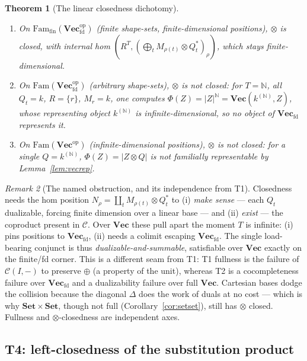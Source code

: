 \documentclass[11pt]{amsart}
\theoremstyle{plain}
\newtheorem{theorem}{Theorem}[section]
\theoremstyle{definition}
\theoremstyle{remark}
\newtheorem{remark}[theorem]{Remark}
\newcommand{\C}{\mathcal{C}}
\newcommand{\Set}{\mathbf{Set}}
\newcommand{\Vect}{\mathbf{Vec}}
\newcommand{\Vecfd}{\mathbf{Vec}_{\mathrm{fd}}}
\newcommand{\Fam}{\mathrm{Fam}}
\newcommand{\op}{\mathrm{op}}
\newcommand{\coprodd}{\textstyle\coprod}
\begin{document}
\begin{theorem}[The linear closedness dichotomy]\label{thm:vecdicho}
\begin{enumerate}
\item On $\Fam_{\mathrm{fin}}(\Vecfd^\op)$ (finite shape-sets, finite-dimensional positions),
$\otimes$ is closed, with internal hom $(R^T,(\bigoplus_t M_{\rho(t)}\otimes Q_t^*)_\rho)$, which
stays finite-dimensional.
\item On $\Fam(\Vecfd^\op)$ (arbitrary shape-sets), $\otimes$ is not closed: for $T=\mathbb{N}$, all
$Q_t=k$, $R=\{r\}$, $M_r=k$, one computes $\Phi(Z)=|Z|^{\mathbb{N}}=\Vect(k^{(\mathbb{N})},Z)$, whose
representing object $k^{(\mathbb{N})}$ is infinite-dimensional, so no object of $\Vecfd$ represents
it.
\item On $\Fam(\Vect^\op)$ (infinite-dimensional positions), $\otimes$ is not closed: for a single
$Q=k^{(\mathbb{N})}$, $\Phi(Z)=|Z\otimes Q|$ is not familially representable by
Lemma~\ref{lem:vecrep}.
\end{enumerate}
\end{theorem}

\begin{remark}[The named obstruction, and its independence from T1]\label{rem:T2named}
Closedness needs the hom position $N_\rho=\coprodd_t M_{\rho(t)}\otimes Q_t^*$ to (i) \emph{make
sense} --- each $Q_t$ dualizable, forcing finite dimension over a linear base --- and (ii)
\emph{exist} --- the coproduct present in $\C$. Over $\Vect$ these pull apart the moment $T$ is
infinite: (i) pins positions to $\Vecfd$, (ii) needs a colimit escaping $\Vecfd$. The single
load-bearing conjunct is thus \emph{dualizable-and-summable}, satisfiable over $\Vect$ exactly on the
finite/fd corner. This is a different seam from T1: T1 fullness is the failure of $\C(I,-)$ to
preserve $\oplus$ (a property of the unit), whereas T2 is a cocompleteness failure over $\Vecfd$ and
a dualizability failure over full $\Vect$. Cartesian bases dodge the collision because the diagonal
$\Delta$ does the work of duals at no cost --- which is why $\Set\times\Set$, though not full
(Corollary~\ref{cor:setset}), still has $\otimes$ closed. Fullness and $\otimes$-closedness are
independent axes.
\end{remark}

\subsection{T4: left-closedness of the substitution product}\label{ss:T4}
\end{document}
